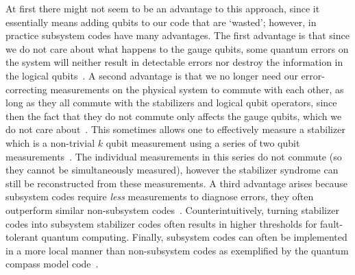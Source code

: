 \documentclass[twocolumn,showpacs,preprintnumbers,amsmath,amssymb,nofootinbib,pra,floatfix]{revtex4-1}
\begin{document}
At first there might not seem to be an advantage to this approach, since it essentially means adding qubits to our code that are
`wasted'; however, in practice subsystem codes have many advantages.  The first advantage is that since we do not care about what happens to the gauge qubits, some quantum errors on the system will neither result in detectable errors nor destroy the information in the logical qubits~\cite{Poulin:05a,Kribs:05a,Kribs:05b,Kribs:06a,Bacon:06a}.  A second advantage is that we no longer need our error-correcting measurements on the physical system to commute with each other, as long as they all commute with the stabilizers and logical qubit operators, since then the fact that they do not commute only affects the gauge qubits, which we do not care about~\cite{Aliferis:07a}.  This sometimes allows one to effectively measure a stabilizer which is a non-trivial $k$ qubit measurement using a series of two qubit measurements~\cite{Aliferis:07a}.  The individual measurements in this series do not commute (so they cannot be simultaneously measured), however the stabilizer syndrome can still be reconstructed from these measurements.  A third advantage arises because subsystem codes require {\em less} measurements to diagnose errors, they often outperform similar non-subsystem codes~\cite{Aliferis:07a,Cross:07a}.  Counterintuitively, turning stabilizer codes into subsystem stabilizer codes often results in higher thresholds for fault-tolerant quantum computing.  Finally, subsystem codes can often be implemented in a more local manner than non-subsystem codes as exemplified by the quantum compass model code~\cite{Bacon:06a,Aliferis:07a}.
\end{document}
